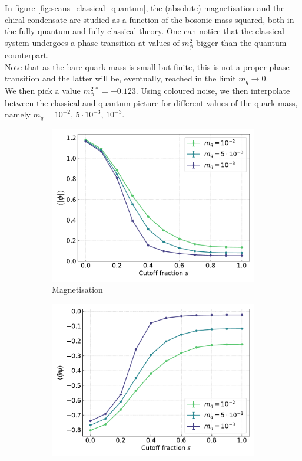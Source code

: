 In figure \ref{fig:scans_classical_quantum}, the (absolute) magnetisation and the chiral condensate are studied as a function of the bosonic mass squared, both in the fully quantum and fully classical theory. One can notice that the classical system undergoes a phase transition at values of $m_\phi^2$ bigger than the quantum counterpart. \\
Note that as the bare quark mass is small but finite, this is not a proper phase transition and the latter will be, eventually, reached in the limit $m_q \to 0$. \\
We then pick a value $m_\phi^{2 \, *} = -0.123$. Using coloured noise, we then interpolate between the classical and quantum picture for different values of the quark mass, namely $m_q = 10^{-2}, \, 5 \cdot 10^{-3}, \, 10^{-3}$.
\begin{figure}[h!]
\centering
\begin{subfigure}{0.47\textwidth}	
	\includegraphics[width=\textwidth]{figures/chiral_PT/magnetisation.pdf}
    \caption{Magnetisation}
\end{subfigure}
\begin{subfigure}{0.47\textwidth}	
	\includegraphics[width=\textwidth]{figures/chiral_PT/condensate.pdf}

\end{subfigure}
\end{figure}
